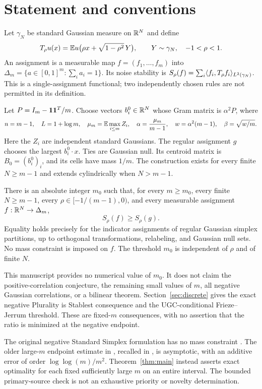 \section{Statement and conventions}
Let $\gamma_N$ be standard Gaussian measure on $\mathbb R^N$ and define
\[
 T_\rho u(x)=\mathbb E u\bigl(\rho x+\sqrt{1-\rho^2}\,Y\bigr),
 \qquad Y\sim\gamma_N,\quad -1<\rho<1.
\]
An assignment is a measurable map $f=(f_1,\ldots,f_m)$ into
$\Delta_m=\{a\in[0,1]^m:\sum_i a_i=1\}$. Its noise stability is
$S_\rho(f)=\sum_i\langle f_i,T_\rho f_i\rangle_{L^2(\gamma_N)}$.
This is a single-assignment functional; two independently chosen rules
are not permitted in its definition.

Let $P=I_m-\mathbf 1\mathbf 1^T/m$. Choose vectors $b_i^0\in\mathbb R^N$ whose Gram
matrix is $\alpha^2P$, where
\begin{equation}\label{eq:scales}
 n=m-1,\quad L=1+\log m,\quad
 \mu_m=\mathbb E\max_{i\le m}Z_i,\quad
 \alpha=\frac{\mu_m}{m-1},\quad w=\alpha^2(m-1),\quad
 \beta=\sqrt{w/m}.
\end{equation}
Here the $Z_i$ are independent standard Gaussians. The regular assignment
$g$ chooses the largest $b_i^0\cdot x$. Ties are Gaussian null. Its
centroid matrix is $B_0=(b_i^0)_i$, and its cells have mass $1/m$.
The construction exists for every finite $N\ge m-1$ and extends
cylindrically when $N>m-1$.

\begin{theorem}\label{thm:main}
There is an absolute integer $m_0$ such that, for every $m\ge m_0$,
every finite $N\ge m-1$, every $\rho\in[-1/(m-1),0)$, and every
measurable assignment $f:\mathbb R^N\to\Delta_m$,
\[
                         S_\rho(f)\ge S_\rho(g).
\]
Equality holds precisely for the indicator assignments of regular
Gaussian simplex partitions, up to orthogonal transformations,
relabeling, and Gaussian null sets. No mass constraint is imposed on $f$.
The threshold $m_0$ is independent of $\rho$ and of finite $N$.
\end{theorem}

This manuscript provides no numerical value of $m_0$. It does not claim
the positive-correlation conjecture, the remaining small values of $m$,
all negative Gaussian correlations, or a bilinear theorem. Section~\ref{sec:discrete}
gives the exact negative Plurality is Stablest consequence and the
UGC-conditional Frieze--Jerrum threshold. These are fixed-$m$ consequences,
with no assertion that the ratio is minimized at the negative endpoint.

The original negative Standard Simplex formulation has no mass constraint
\cite[Conjecture~1.4]{IM}. The older large-$m$ endpoint estimate in
\cite[Proposition~11.4]{KKMO}, recalled in \cite[equation~(20)]{IM}, is
asymptotic, with an additive error of order $\log\log(m)/m^2$.
Theorem~\ref{thm:main} instead asserts exact optimality for each fixed
sufficiently large $m$ on an entire interval. The bounded primary-source
check \cite{scope} is not an exhaustive priority or novelty determination.

